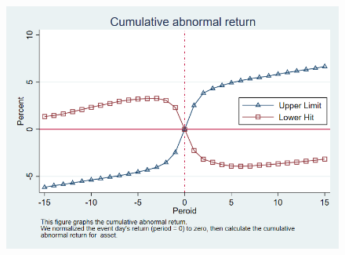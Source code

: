 \documentclass[12pt]{article}
\begin{document}
\begin{figure}[htbp]
\centering
\includegraphics[width=0.7\linewidth]{AR}
\caption{}
\label{fig:ar}
\end{figure}
\end{document}
